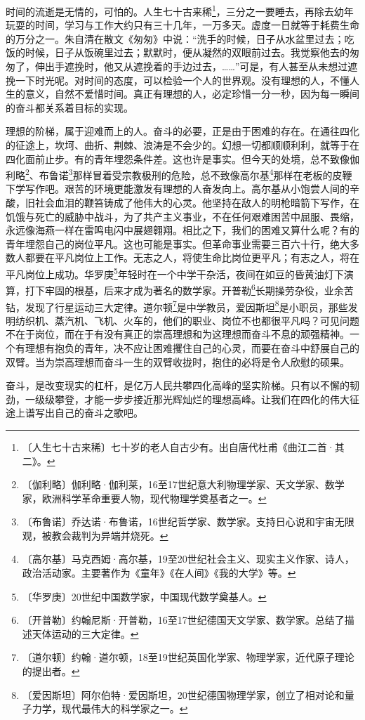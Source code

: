 \documentclass[12pt,UTF-8,openany]{ctexbook}
\begin{document}
\begin{normalsize}
    时间的流逝是无情的，可怕的。人生七十古来稀\footnote{〔人生七十古来稀〕七十岁的老人自古少有。出自唐代杜甫《曲江二首·其二》。}，三分之一要睡去，再除去幼年玩耍的时间，学习与工作大约只有三十几年，一万多天。虚度一日就等于耗费生命的万分之一。朱自清在散文《匆匆》中说：“洗手的时候，日子从水盆里过去；吃饭的时候，日子从饭碗里过去；默默时，便从凝然的双眼前过去。我觉察他去的匆匆了，伸出手遮挽时，他又从遮挽着的手边过去，……”可是，有人甚至从未想过遮挽一下时光呢。对时间的态度，可以检验一个人的世界观。没有理想的人，不懂人生的意义，自然不爱惜时间。真正有理想的人，必定珍惜一分一秒，因为每一瞬间的奋斗都关系着目标的实现。
    
    理想的阶梯，属于迎难而上的人。奋斗的必要，正是由于困难的存在。在通往四化的征途上，坎坷、曲折、荆棘、浪涛是不会少的。幻想一切都顺顺利利，就等于在四化面前止步。有的青年埋怨条件差。这也许是事实。但今天的处境，总不致像伽利略\footnote{〔伽利略〕伽利略·伽利莱，16至17世纪意大利物理学家、天文学家、数学家，欧洲科学革命重要人物，现代物理学奠基者之一。}、布鲁诺\footnote{〔布鲁诺〕乔达诺·布鲁诺，16世纪哲学家、数学家。支持日心说和宇宙无限观，被教会裁判为异端并烧死。}那样冒着受宗教极刑的危险，总不致像高尔基\footnote{〔高尔基〕马克西姆·高尔基，19至20世纪社会主义、现实主义作家、诗人，政治活动家。主要著作为《童年》《在人间》《我的大学》等。}那样在老板的皮鞭下学写作吧。艰苦的环境更能激发有理想的人奋发向上。高尔基从小饱尝人间的辛酸，旧社会血泪的鞭笞铸成了他伟大的心灵。他坚持在敌人的明枪暗箭下写作，在饥饿与死亡的威胁中战斗，为了共产主义事业，不在任何艰难困苦中屈服、畏缩，永远像海燕一样在雷鸣电闪中展翅翱翔。相比之下，我们的困难又算什么呢？有的青年埋怨自己的岗位平凡。这也可能是事实。但革命事业需要三百六十行，绝大多数人都要在平凡岗位上工作。无志之人，将使生命比岗位更平凡；有志之人，将在平凡岗位上成功。华罗庚\footnote{〔华罗庚〕20世纪中国数学家，中国现代数学奠基人。}年轻时在一个中学干杂活，夜间在如豆的昏黄油灯下演算，打下牢固的根基，后来才成为著名的数学家。开普勒\footnote{〔开普勒〕约翰尼斯·开普勒，16至17世纪德国天文学家、数学家。总结了描述天体运动的三大定律。}长期操劳杂役，业余苦钻，发现了行星运动三大定律。道尔顿\footnote{〔道尔顿〕约翰·道尔顿，18至19世纪英国化学家、物理学家，近代原子理论的提出者。}是中学教员，爱因斯坦\footnote{〔爱因斯坦〕阿尔伯特·爱因斯坦，20世纪德国物理学家，创立了相对论和量子力学，现代最伟大的科学家之一。}是小职员，那些发明纺织机、蒸汽机、飞机、火车的，他们的职业、岗位不也都很平凡吗？可见问题不在于岗位，而在于有没有真正的崇高理想和为这理想而奋斗不息的顽强精神。一个有理想有抱负的青年，决不应让困难攫住自己的心灵，而要在奋斗中舒展自己的双臂。当为崇高理想而奋斗一生的双臂收拢时，抱住的必将是令人欣慰的硕果。
    
    奋斗，是改变现实的杠杆，是亿万人民共攀四化高峰的坚实阶梯。只有以不懈的韧劲，一级级攀登，才能一步步接近那光辉灿烂的理想高峰。让我们在四化的伟大征途上谱写出自己的奋斗之歌吧。
    
\end{normalsize}
\end{document}
